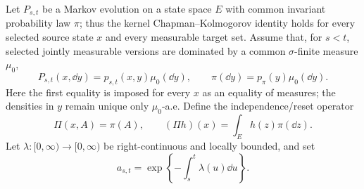 Let $P_{s,t}$ be a Markov evolution on a state space $E$ with common invariant
probability law $\pi$; thus the kernel Chapman--Kolmogorov identity holds for
every selected source state $x$ and every measurable target set.  Assume that,
for $s<t$, selected jointly measurable versions are dominated by a common
$\sigma$-finite measure $\mu_0$,
\[
P_{s,t}(x,\dd y)=p_{s,t}(x,y)\mu_0(\dd y),
\qquad \pi(\dd y)=p_\pi(y)\mu_0(\dd y).
\]
Here the first equality is imposed for every $x$ as an equality of measures;
the densities in $y$ remain unique only $\mu_0$-a.e.
Define the independence/reset operator
\begin{equation}
\Pi(x,A)=\pi(A),\qquad (\Pi h)(x)=\int_Eh(z)\pi(\dd z).
\label{rev:reset-kernel}
\end{equation}
Let $\lambda:[0,\infty)\to[0,\infty)$ be right-continuous and locally bounded,
and set
\begin{equation}
a_{s,t}=\exp\!\left\{-\int_s^t\lambda(u)\dd u\right\}.
\label{rev:survival-weight}
\end{equation}

